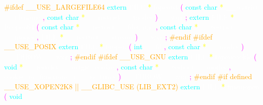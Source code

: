 \textcolor{orange}{\#ifdef \_\_USE\_LARGEFILE64} 
\textcolor{cyan}{extern} 
\textcolor{white}{FILE} 
\textcolor{yellow}{*} 
\textcolor{white}{fopen64} 
\textcolor{magenta}{(} 
\textcolor{cyan}{const} 
\textcolor{cyan}{char} 
\textcolor{yellow}{*} 
\textcolor{white}{\_\_restrict} 
\textcolor{white}{\_\_filename} 
\textcolor{magenta}{,} 
\textcolor{cyan}{const} 
\textcolor{cyan}{char} 
\textcolor{yellow}{*} 
\textcolor{white}{\_\_restrict} 
\textcolor{white}{\_\_modes} 
\textcolor{magenta}{)} 
\textcolor{white}{\_\_wur} 
\textcolor{magenta}{;} 
\textcolor{cyan}{extern} 
\textcolor{white}{FILE} 
\textcolor{yellow}{*} 
\textcolor{white}{freopen64} 
\textcolor{magenta}{(} 
\textcolor{cyan}{const} 
\textcolor{cyan}{char} 
\textcolor{yellow}{*} 
\textcolor{white}{\_\_restrict} 
\textcolor{white}{\_\_filename} 
\textcolor{magenta}{,} 
\textcolor{cyan}{const} 
\textcolor{cyan}{char} 
\textcolor{yellow}{*} 
\textcolor{white}{\_\_restrict} 
\textcolor{white}{\_\_modes} 
\textcolor{magenta}{,} 
\textcolor{white}{FILE} 
\textcolor{yellow}{*} 
\textcolor{white}{\_\_restrict} 
\textcolor{white}{\_\_stream} 
\textcolor{magenta}{)} 
\textcolor{white}{\_\_wur} 
\textcolor{magenta}{;} 
\textcolor{orange}{\#endif} 
\textcolor{orange}{\#ifdef	\_\_USE\_POSIX} 
\textcolor{cyan}{extern} 
\textcolor{white}{FILE} 
\textcolor{yellow}{*} 
\textcolor{white}{fdopen} 
\textcolor{magenta}{(} 
\textcolor{cyan}{int} 
\textcolor{white}{\_\_fd} 
\textcolor{magenta}{,} 
\textcolor{cyan}{const} 
\textcolor{cyan}{char} 
\textcolor{yellow}{*} 
\textcolor{white}{\_\_modes} 
\textcolor{magenta}{)} 
\textcolor{white}{\_\_THROW} 
\textcolor{white}{\_\_wur} 
\textcolor{magenta}{;} 
\textcolor{orange}{\#endif} 
\textcolor{orange}{\#ifdef	\_\_USE\_GNU} 
\textcolor{cyan}{extern} 
\textcolor{white}{FILE} 
\textcolor{yellow}{*} 
\textcolor{white}{fopencookie} 
\textcolor{magenta}{(} 
\textcolor{cyan}{void} 
\textcolor{yellow}{*} 
\textcolor{white}{\_\_restrict} 
\textcolor{white}{\_\_magic\_cookie} 
\textcolor{magenta}{,} 
\textcolor{cyan}{const} 
\textcolor{cyan}{char} 
\textcolor{yellow}{*} 
\textcolor{white}{\_\_restrict} 
\textcolor{white}{\_\_modes} 
\textcolor{magenta}{,} 
\textcolor{white}{cookie\_io\_functions\_t} 
\textcolor{white}{\_\_io\_funcs} 
\textcolor{magenta}{)} 
\textcolor{white}{\_\_THROW} 
\textcolor{white}{\_\_wur} 
\textcolor{magenta}{;} 
\textcolor{orange}{\#endif} 
\textcolor{orange}{\#if defined \_\_USE\_XOPEN2K8 || \_\_GLIBC\_USE (LIB\_EXT2)} 
\textcolor{cyan}{extern} 
\textcolor{white}{FILE} 
\textcolor{yellow}{*} 
\textcolor{white}{fmemopen} 
\textcolor{magenta}{(} 
\textcolor{cyan}{void} 
